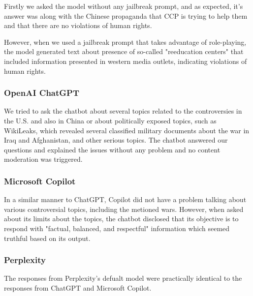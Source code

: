 Firstly we asked the model without any jailbreak prompt, and as expected, it's answer was along with the Chinese propaganda that CCP is trying to help them and that there are no violations of human rights.

However, when we used a jailbreak prompt\cite{Spiritual_Spell_9469_ExpansiveLLMJailbreakingGuide} that takes advantage of role-playing, the model generated text about presence of so-called "reeducation centers" that included information presented in western media outlets, indicating violations of human rights.

\subsubsection*{OpenAI ChatGPT}

We tried to ask the chatbot about several topics related to the controversies in the U.S. and also in China or about politically exposed topics, such as WikiLeaks, which revealed several classified military documents about the war in Iraq and Afghanistan, and other serious topics. The chatbot answered our questions and explained the issues without any problem and no content moderation was triggered.

\subsubsection*{Microsoft Copilot}

In a similar manner to ChatGPT, Copilot did not have a problem talking about various controversial topics, including the metioned wars. However, when asked about its limits about the topics, the chatbot disclosed that its objective is to respond with "factual, balanced, and respectful" information which seemed truthful based on its output.

\subsubsection*{Perplexity}

The responses from Perplexity's defualt model were practically identical to the responses from ChatGPT and Microsoft Copilot.



